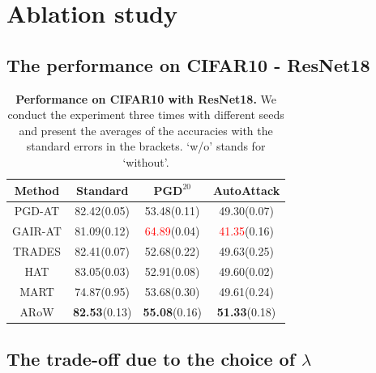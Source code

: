 \documentclass[nohyperref]{article}
\theoremstyle{plain}
\theoremstyle{definition}
\theoremstyle{remark}
\begin{document}
\section{Ablation study}
\label{appD}
\subsection{The performance on CIFAR10 - ResNet18}
\begin{table}[H]
    \centering
    \caption{\textbf{Performance on CIFAR10 with ResNet18.} We conduct the experiment three times with different seeds and present the averages of the accuracies with the standard errors in the brackets. `w/o' stands for `without'.}
    \begin{tabular}{c|ccc}
    \hline
    \textbf{Method} & \textbf{Standard}  & $\textbf{PGD}^{20}$  & \textbf{AutoAttack}  \\
    \hline
    \hline
    PGD-AT                      & 82.42(0.05) & 53.48(0.11) & 49.30(0.07) \\
    GAIR-AT                     & 81.09(0.12) & \textcolor{red}{64.89}(0.04) & \textcolor{red}{41.35}(0.16) \\
    TRADES                      & 82.41(0.07) & 52.68(0.22) & 49.63(0.25) \\
    HAT                         & 83.05(0.03) & 52.91(0.08) & 49.60(0.02) \\
    MART                        & 74.87(0.95) & 53.68(0.30) & 49.61(0.24) \\
    ARoW                        & \textbf{82.53}(0.13) & \textbf{55.08}(0.16) & \textbf{51.33}(0.18) \\
    \hline
    \end{tabular}
\end{table}


\subsection{The trade-off due to the choice of $\lambda$}
\label{ablation:lambda}
\end{document}
